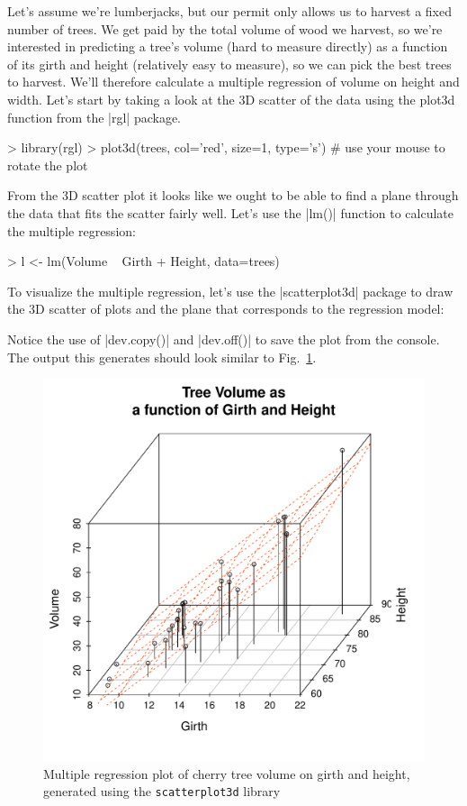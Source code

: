 Let's assume we're lumberjacks, but our permit only allows us to harvest a fixed number of trees.  We get paid by the total volume of wood we harvest, so we're interested in predicting a tree's volume (hard to measure directly) as a function of its girth and height (relatively easy to measure), so we can pick the best trees to harvest.  We'll therefore calculate a multiple regression of volume on height and width. Let's start by taking a look at the 3D scatter of the data using the plot3d function from the |rgl| package.
%
\begin{R}
> library(rgl)
> plot3d(trees, col='red', size=1, type='s') # use your mouse to rotate the plot
\end{R}
%
From the 3D scatter plot it looks like we ought to be able to find a plane through the data that fits the scatter fairly well. Let's use the |lm()| function to calculate the multiple regression:
%
\begin{R}
> l <- lm(Volume ~ Girth + Height, data=trees)
\end{R}
%
To visualize the multiple regression, let's use the |scatterplot3d| package to draw the 3D scatter of plots and the plane that corresponds to the regression model:
%
%
Notice the use of |dev.copy()| and |dev.off()| to save the plot from the console.  The output this generates should look similar to Fig.~\ref{fig:treesregr}.
%
\begin{figure}[htbp]
\centering
\includegraphics[width=0.5\columnwidth]{./figures/hands-on4/trees-regrfit.pdf}
\caption{Multiple regression plot of cherry tree volume on girth and height, generated using the \texttt{scatterplot3d} library\label{fig:treesregr}}
\end{figure}

